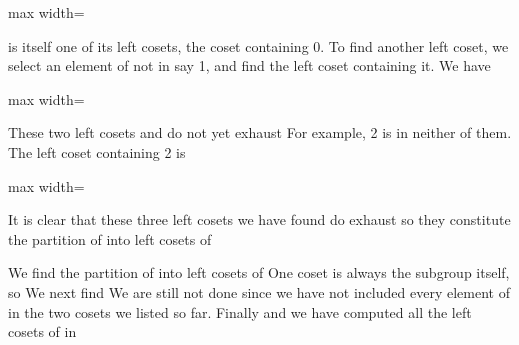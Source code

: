 \documentclass[11pt,oneside]{article}
\begin{document}
\begin{BookBody}
\begin{center}\begin{adjustbox}{max width=\linewidth}\end{adjustbox}\end{center}

\noindent is itself one of its left cosets, the coset containing 0. To find another left coset, we select an element of  not in  say 1, and find the left coset containing it. We have

\begin{center}\begin{adjustbox}{max width=\linewidth}\end{adjustbox}\end{center}

\noindent These two left cosets and  do not yet exhaust  For example, 2 is in neither of them. The left coset containing 2 is

\begin{center}\begin{adjustbox}{max width=\linewidth}\end{adjustbox}\end{center}

\noindent It is clear that these three left cosets we have found do exhaust  so they constitute the partition of  into left cosets of \BookEnd{\blacktriangle}

 We find the partition of  into left cosets of  One coset is always the subgroup itself, so  We next find  We are still not done since we have not included every element of  in the two cosets we listed so far. Finally and we have computed all the left cosets of  in \BookEnd{\blacktriangle}


\end{BookBody}
\end{document}
